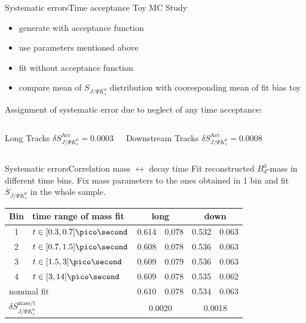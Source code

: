 \documentclass{beamer}
\newcommand{\Bd}{$B_d^0$}
\newcommand{\SJPsi}{S_{J/\Psi K_s^0}}
\begin{document}
\begin{frame}{Systematic errors}{Time acceptance}
Toy MC Study
\begin{itemize}
\item generate with acceptance function 
\item use parameters mentioned above
\item fit without acceptance function
\item compare mean of $\SJPsi$ distribution with cooresponding mean of fit bias toy
\end{itemize}

Assignment of systematic error due to neglect of any time acceptance:
	\begin{columns}
	\begin{block}{Long Tracks}
    \centering
        $\delta\SJPsi^{\text{Acc}} = 0.0003$
    \end{block}
	\begin{block}{Downstream Tracks}
    \centering
        $\delta\SJPsi^{\text{Acc}} = 0.0008$
    \end{block}
    \end{columns}


\end{frame}

\begin{frame}{Systematic errors}{Correlation mass $\leftrightarrow$ decay time}
Fit reconstructed \Bd-mass in different time bins. Fix mass parameters to the ones obtained in 1 bin and fit $\SJPsi$ in the whole sample.
\begin{center}
\begin{tabular}{c l r@{$\pm$}l r@{$\pm$}l}
\hline \hline
Bin & time range of mass fit & \multicolumn{2}{c}{long} & \multicolumn{2}{c}{down} \\ \hline
1 & $t \in [0.3, 0.7] \pico\second$ & 0.614 & 0.078 & 0.532 & 0.063 \\
2 & $t \in [0.7, 1.5] \pico\second$ & 0.608 & 0.078 & 0.536 & 0.063 \\
3 & $t \in [1.5, 3] \pico\second$ & 0.609 & 0.079 & 0.536 & 0.063 \\
4 & $t \in [3, 14] \pico\second$ & 0.609 & 0.078 & 0.535 & 0.062 \\ \hline
\multicolumn{2}{l}{nominal fit}  & 0.610 & 0.078 & 0.534 & 0.063 \\ \hline
\multicolumn{2}{l}{$\delta\SJPsi^{\text{mass/t}}$} & \multicolumn{2}{c}{0.0020} & \multicolumn{2}{c}{0.0018} \\

\hline \hline
\end{tabular}
\end{center}
\end{frame}
\end{document}
